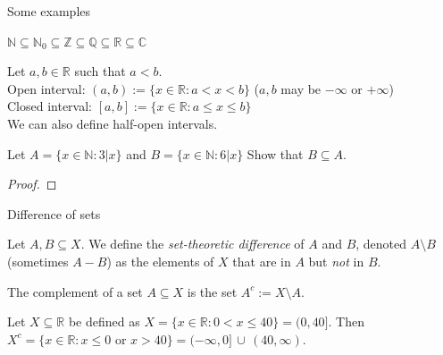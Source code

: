 \documentclass [aspectratio=169, handout]{beamer}
\newcommand{\R}{{\mathbb{R}}}
\newcommand{\N}{{\mathbb{N}}}
\begin{document}
\begin{frame}{Some examples}

\begin{example}
$\mathbb{N} \subseteq \mathbb{N}_0 \subseteq \mathbb{Z} \subseteq \mathbb{Q} \subseteq \mathbb{R} \subseteq \mathbb{C}$
\end{example}

\begin{example}  Let $a, b \in \R$ such that $a < b$. \\
Open interval: $(a,b) := \{x \in \R : a < x < b \}$  ($a,b$ may be $- \infty$ or $+ \infty$)\\
Closed interval: $[a,b] := \{x \in \R : a \leq x \leq b \}$ \\
We can also define half-open intervals. 
\end{example}

\end{frame}


\begin{frame}
\begin{example}
Let $A = \{x \in \N: 3 | x \}$ and $B = \{x \in \N: 6 | x \}$
Show that $B \subseteq A$. 
\end{example}
\begin{proof}
\vspace{3cm}
\end{proof}
\end{frame}

\begin{frame}{Difference of sets}
\begin{definition}
Let $A,B \subseteq X$. We define the \emph{set-theoretic difference} of $A$ and $B$, denoted $A \setminus B$ (sometimes $A-B$) as the elements of $X$ that are in $A$ but \emph{not} in $B$. 

The complement of a set $A \subseteq X$ is the set $A^c := X \setminus A$.
\end{definition}

\vspace{2em}

\begin{example}
Let $X\subseteq\R$ be defined as $X = \{x \in \R: 0 < x \leq 40 \} = (0,40]$. Then $X^c = \{x \in \R: x \leq 0 \text{ or } x > 40 \} = (-\infty, 0] \, \cup \, (40, \infty) $.
\end{example}

\end{frame}
\end{document}
